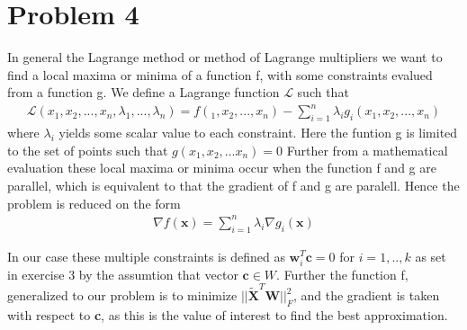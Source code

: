 \documentclass[a4paper,norsk]{article}
\begin{document}
\section*{Problem 4}
In general the Lagrange method or method of Lagrange multipliers we want to find a local maxima or minima of a function f, with some constraints evalued from a function g. 
We define a Lagrange function $\mathcal{L}$ such that 
\begin{align*}
\mathcal{L}(x_1, x_2,...,x_n, \lambda_1, ..., \lambda_n) = f(_1, x_2,...,x_n) - \sum_{i=1}^n \lambda_i g_i(x_1, x_2,...,x_n)  
\end{align*}
where $\lambda_i$ yields some scalar value to each constraint. Here the funtion g is limited to the set of points such that
$g(x_1, x_2,...x_n) = 0$
Further from a mathematical evaluation these local maxima or minima occur when the function f and g are parallel, which is equivalent to that the gradient of f and g are paralell. Hence the problem is reduced on the form
\begin{align}
\nabla f(\textbf{x}) = \sum_{i=1}^n \lambda_i \nabla g_i(\textbf{x})
\end{align}

In our case these multiple constraints is defined as $\textbf{w}_i^T \textbf{c} = 0$ for $i = 1, ..,k$ as set in exercise 3 by the assumtion that  vector $\textbf{c} \in W$. Further the function f, generalized to our problem is to minimize 
$||\tilde{\textbf{X}}^T \textbf{W} ||_F^2  $, and the gradient is taken with respect to \textbf{c}, as this is the value of interest to find the best approximation. \newline \newline
\end{document}
